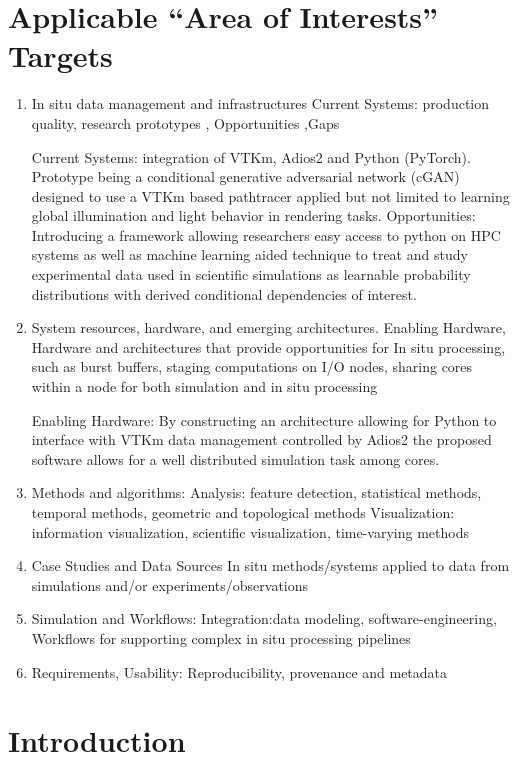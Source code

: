 \documentclass[sigconf,authordraft]{acmart}
\begin{document}
\section{Applicable ``Area of Interests'' Targets}
\begin{enumerate}
    \item In situ data management and infrastructures
Current Systems: production quality, research prototypes , Opportunities ,Gaps

Current Systems: integration of VTKm, Adios2 and Python (PyTorch). Prototype being a conditional generative adversarial network (cGAN) designed to use a VTKm based pathtracer applied but not limited to learning global illumination and light behavior in rendering tasks. 
Opportunities: Introducing a framework allowing researchers easy access to python on HPC systems as well as machine learning aided technique to treat and study experimental data used in scientific simulations as learnable probability distributions with derived conditional dependencies of interest.

   \item System resources, hardware, and emerging architectures.
Enabling Hardware, Hardware and architectures that provide opportunities for In situ processing, such as burst buffers, staging computations on I/O nodes, sharing cores within a node for both simulation and in situ processing

Enabling Hardware: By constructing an architecture allowing for Python to interface with VTKm data management controlled by Adios2 the proposed software allows for a well distributed simulation task among cores.

  \item Methods and algorithms:
Analysis: feature detection, statistical methods, temporal methods, geometric and topological methods 
Visualization: information visualization, scientific visualization, time-varying methods
  \item Case Studies and Data Sources
In situ methods/systems applied to data from simulations and/or experiments/observations
  \item Simulation and Workflows:
Integration:data modeling, software-engineering, 
Workflows for supporting complex in situ processing pipelines
  \item Requirements, Usability:
Reproducibility, provenance and metadata

\end{enumerate}

\section{Introduction}
\end{document}
